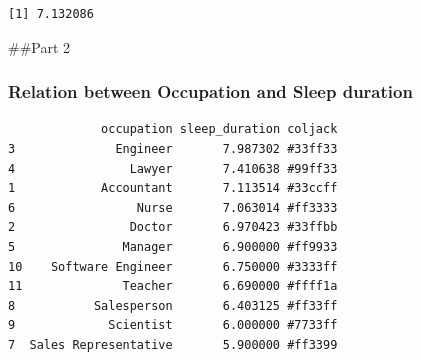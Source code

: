 \documentclass[
  letterpaper,
  DIV=11,
  numbers=noendperiod]{scrartcl}
\newenvironment{Shaded}{\begin{snugshade}}{\end{snugshade}}
\newcommand{\AttributeTok}[1]{\textcolor[rgb]{0.40,0.45,0.13}{#1}}
\newcommand{\CommentTok}[1]{\textcolor[rgb]{0.37,0.37,0.37}{#1}}
\newcommand{\DecValTok}[1]{\textcolor[rgb]{0.68,0.00,0.00}{#1}}
\newcommand{\FunctionTok}[1]{\textcolor[rgb]{0.28,0.35,0.67}{#1}}
\newcommand{\NormalTok}[1]{\textcolor[rgb]{0.00,0.23,0.31}{#1}}
\newcommand{\OtherTok}[1]{\textcolor[rgb]{0.00,0.23,0.31}{#1}}
\newcommand{\SpecialCharTok}[1]{\textcolor[rgb]{0.37,0.37,0.37}{#1}}
\newcommand{\StringTok}[1]{\textcolor[rgb]{0.13,0.47,0.30}{#1}}
\begin{document}
\begin{Shaded}
\end{Shaded}

\begin{verbatim}
[1] 7.132086
\end{verbatim}

\#\#Part 2

\subsubsection{Relation between Occupation and Sleep
duration}\label{relation-between-occupation-and-sleep-duration}

\begin{Shaded}
\end{Shaded}

\begin{verbatim}
             occupation sleep_duration coljack
3              Engineer       7.987302 #33ff33
4                Lawyer       7.410638 #99ff33
1            Accountant       7.113514 #33ccff
6                 Nurse       7.063014 #ff3333
2                Doctor       6.970423 #33ffbb
5               Manager       6.900000 #ff9933
10    Software Engineer       6.750000 #3333ff
11              Teacher       6.690000 #ffff1a
8           Salesperson       6.403125 #ff33ff
9             Scientist       6.000000 #7733ff
7  Sales Representative       5.900000 #ff3399
\end{verbatim}
\end{document}
